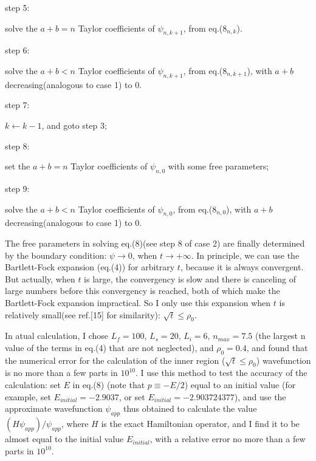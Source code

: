 \vspace{4mm}
\noindent step 5: \parbox[t]{146mm}
{solve the $a+b=n$ Taylor coefficients of $\psi_{n,k+1}$, from
eq.($8_{n,k}$).}

\vspace{1.5mm}
\noindent step 6: \parbox[t]{146mm}
{solve the $a+b<n$ Taylor coefficients of $\psi_{n,k+1}$, from
eq.($8_{n,k+1}$), with $a+b$ decreasing(analogous to case 1) to $0$.}

\vspace{4mm}
\noindent step 7: \parbox[t]{146mm}
{$k\gets k-1$, and goto step 3;}

\vspace{1.5mm}
\noindent step 8: \parbox[t]{146mm}
{set the $a+b=n$ Taylor coefficients of $\psi_{n,0}$ with some free
parameters;}

\vspace{1.7mm}
\noindent step 9: \parbox[t]{146mm}
{solve the $a+b<n$ Taylor coefficients of $\psi_{n,0}$,
from eq.($8_{n,0}$), with $a+b$ decreasing(analogous to case 1) to $0$.}

\vspace{4mm}
The free parameters in solving eq.(8)(see step 8 of case 2) are
finally determined by the boundary condition: $\psi\to 0$,
when $t\to +\infty$. In principle, we can use the Bartlett-Fock expansion
(eq.(4)) for arbitrary $t$, because it is always convergent. But actually,
when $t$ is large, the convergency is slow and there is canceling of large
numbers before this convergency is reached, both of which make
the Bartlett-Fock expansion impractical. So I only use this expansion when
$t$ is relatively small(see ref.[15] for similarity):
$\sqrt{t} \le \rho_{0}$.

In atual calculation,
I chose $L_{f}=100$, $L_{s}=20$, $L_{i}=6$, $n_{max}=7.5$ (the largest n value
of the terms in eq.(4) that are not neglected),
and $\rho_{0}=0.4$, and found that
the numerical error for the calculation
of the inner region ($\sqrt{t}\le\rho_{0}$)
wavefunction is no more than a few parts in $10^{10}$.
I use this method to test the accuracy of the calculation: set $E$ in
eq.(8) (note that $p \equiv -E/2$) equal to an initial value
(for example, set $E_{initial} = -2.9037$, or set $E_{initial} = -2.903724377$),
and use the approximate wavefunction $\psi_{app}$
thus obtained to calculate the value
$(H\psi_{app})/\psi_{app}$, where $H$ is the exact Hamiltonian operator,
and I find it to be almost equal to the initial value $E_{initial}$,
with a relative error no more than a few parts in $10^{10}$.

